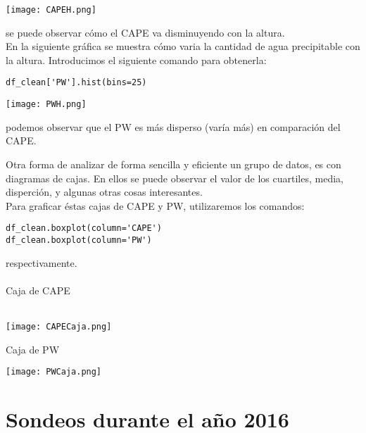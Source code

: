 \documentclass[a4paper]{article}
\begin{document}
\begin{center}
\texttt{[image: CAPEH.png]}
\end{center}
se puede observar cómo el CAPE va disminuyendo con la altura.\\

En la siguiente gráfica se muestra cómo varia la cantidad de agua precipitable con la altura. Introducimos el siguiente comando para obtenerla: \begin{verbatim}
df_clean['PW'].hist(bins=25)
\end{verbatim}
\begin{center}
\texttt{[image: PWH.png]}
\end{center}
podemos observar que el PW es más disperso (varía más) en comparación del CAPE.
\newpage

Otra forma de analizar de forma sencilla y eficiente un grupo de datos, es con diagramas de cajas. En ellos se puede observar el valor de los cuartiles, media, disperción, y algunas otras cosas interesantes. \\
Para graficar éstas cajas de CAPE y PW, utilizaremos los comandos: \begin{verbatim}
df_clean.boxplot(column='CAPE')
df_clean.boxplot(column='PW')
\end{verbatim}
respectivamente.\\ \\

Caja de CAPE\\ \\
\begin{center}
\texttt{[image: CAPECaja.png]}
\end{center}
Caja de PW\\
\begin{center}
\texttt{[image: PWCaja.png]}
\end{center}
\newpage
\section*{Sondeos durante el año 2016}
\end{document}
